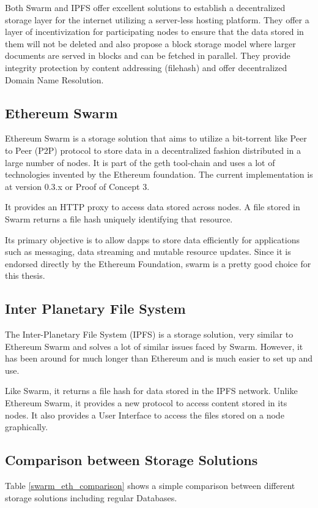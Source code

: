 \documentclass[11pt,openright]{report}
\begin{document}
Both Swarm and IPFS offer excellent solutions to establish a decentralized storage layer for the internet utilizing a server-less hosting platform. They offer a layer of incentivization for participating nodes to ensure that the data stored in them will not be deleted and also propose a block storage model where larger documents are served in blocks and can be fetched in parallel. They provide integrity protection by content addressing (filehash) and offer decentralized Domain Name Resolution.

\subsection{Ethereum Swarm}
Ethereum Swarm \cite{swarm} is a storage solution that aims to utilize a bit-torrent like Peer to Peer (P2P) protocol to store data in a decentralized fashion distributed in a large number of nodes. It is part of the geth tool-chain and uses a lot of technologies invented by the Ethereum foundation. The current implementation is at version 0.3.x or Proof of Concept 3. 

It provides an HTTP proxy to access data stored across nodes. A file stored in Swarm returns a file hash uniquely identifying that resource.

Its primary objective is to allow dapps to store data efficiently for applications such as messaging, data streaming and mutable resource updates. Since it is endorsed directly by the Ethereum Foundation, swarm is a pretty good choice for this thesis.

\subsection{Inter Planetary File System}
The Inter-Planetary File System (IPFS) \cite{ipfs2014} is a storage solution, very similar to Ethereum Swarm and solves a lot of similar issues faced by Swarm. However, it has been around for much longer than Ethereum and is much easier to set up and use.

Like Swarm, it returns a file hash for data stored in the IPFS network. Unlike Ethereum Swarm, it provides a new protocol to access content stored in its nodes. It also provides a User Interface to access the files stored on a node graphically.

\subsection{Comparison between Storage Solutions}
Table \ref{swarm_eth_comparison} shows a simple comparison between
different storage solutions including regular Databases.
\end{document}
